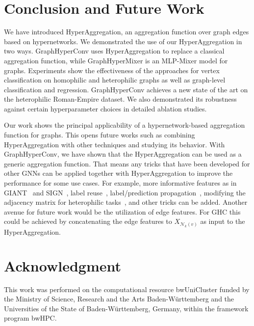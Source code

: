 \documentclass[conference]{IEEEtran}
\begin{document}
\section{Conclusion and Future Work}
\label{sec:conclusion}
We have introduced HyperAggregation, an aggregation function over graph edges based on hypernetworks.
We demonstrated the use of our HyperAggregation in two ways.
GraphHyperConv uses HyperAggregation to replace a classical aggregation function, while GraphHyperMixer is an MLP-Mixer model for graphs.
Experiments show the effectiveness of the approaches for vertex classification on homophilic and heterophilic graphs as well as graph-level classification and regression.
GraphHyperConv achieves a new state of the art on the heterophilic Roman-Empire dataset.
We also demonstrated its robustness against certain hyperparameter choices in detailed ablation studies.

Our work shows the principal applicability of a hypernetwork-based aggregation function for graphs.
This opens future works such as combining HyperAggregation with other techniques and studying its behavior. 
With GraphHyperConv, we have shown that the HyperAggregation can be used as a generic aggregation function.
That means any tricks that have been developed for other GNNs can be applied together with HyperAggregation to improve the performance for some use cases.
For example, more informative features as in GIANT~\citep{DBLP:conf/iclr/ChienCHYZMD22} and SIGN~\citep{SIGN/corr/abs-2004-11198}, label reuse~\citep{DBLP:journals/corr/abs-2103-13355}, label/prediction propagation~\citep{SAGN/corr/abs-2104-09376,DBLP:conf/ijcnn/HoffmannGS23}, modifying the adjacency matrix for heterophilic tasks~\citep{esgnn/corr/abs-2205-13700}, and other tricks can be added.
Another avenue for future work would be the utilization of edge features.
For GHC this could be achieved by concatenating the edge features to $X_{\mathcal{N}_k(v)}$ as input to the HyperAggregation.



\section*{Acknowledgment}
This work was performed on the computational resource bwUniCluster funded by the Ministry of Science, Research and the Arts Baden-Württemberg and the Universities of the State of Baden-Württemberg, Germany, within the framework program bwHPC.


\printbibliography
\end{document}
